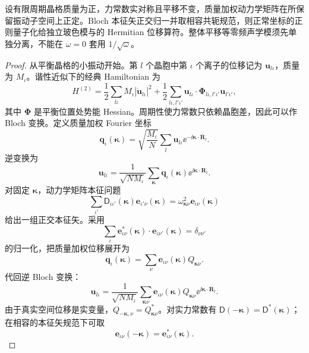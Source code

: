 \begin{theorem}[周期谐性格的正交正常模量子化]
设有限周期晶格质量为正，力常数实对称且平移不变，质量加权动力学矩阵在所保留振动子空间上正定。Bloch 本征矢正交归一并取相容共轭规范，则正常坐标的正则量子化给独立玻色模与的 Hermitian 位移算符。整体平移等零频声学模须先单独分离，不能在 $\omega=0$ 套用 $1/\sqrt\omega$。
\end{theorem}
\begin{proof}
从平衡晶格的小振动开始。第 $l$ 个晶胞中第 $\iota$ 个离子的位移记为 $\mathbf u_{l\iota}$，质量为 $M_\iota$。谐性近似下的经典 Hamiltonian 为
\[
H^{(2)}
=\frac12\sum_{l\iota}M_\iota|\dot{\mathbf u}_{l\iota}|^2
+\frac12\sum_{l\iota,l'\iota'}
\mathbf u_{l\iota}\cdot
\boldsymbol\Phi_{l\iota,l'\iota'}\mathbf u_{l'\iota'},
\]
其中 $\boldsymbol\Phi$ 是平衡位置处势能 Hessian。周期性使力常数只依赖晶胞差，因此可以作 Bloch 变换。定义质量加权 Fourier 坐标
\[
\mathbf q_\iota(\boldsymbol\kappa)
=\sqrt{\frac{M_\iota}{N}}
\sum_l\mathbf u_{l\iota}\ee^{-\ii\boldsymbol\kappa\cdot\mathbf R_l}.
\]
逆变换为
\[
\mathbf u_{l\iota}
=\frac1{\sqrt{NM_\iota}}
\sum_{\boldsymbol\kappa}
\mathbf q_\iota(\boldsymbol\kappa)
\ee^{\ii\boldsymbol\kappa\cdot\mathbf R_l}.
\]
对固定 $\boldsymbol\kappa$，动力学矩阵本征问题
\[
\sum_{\iota'}\mathsf D_{\iota\iota'}(\boldsymbol\kappa)
\mathbf e_{\iota'\nu}(\boldsymbol\kappa)
=\omega_{\boldsymbol\kappa\nu}^2
\mathbf e_{\iota\nu}(\boldsymbol\kappa)
\]
给出一组正交本征矢。采用
\[
\sum_\iota
\mathbf e_{\iota\nu}^*(\boldsymbol\kappa)\cdot
\mathbf e_{\iota\nu'}(\boldsymbol\kappa)
=\delta_{\nu\nu'}
\]
的归一化，把质量加权位移展开为
\[
\mathbf q_\iota(\boldsymbol\kappa)
=\sum_\nu\mathbf e_{\iota\nu}(\boldsymbol\kappa)
Q_{\boldsymbol\kappa\nu}.
\]
代回逆 Bloch 变换：
\[
\mathbf u_{l\iota}
=\frac1{\sqrt{NM_\iota}}
\sum_{\boldsymbol\kappa\nu}
\mathbf e_{\iota\nu}(\boldsymbol\kappa)
Q_{\boldsymbol\kappa\nu}
\ee^{\ii\boldsymbol\kappa\cdot\mathbf R_l}.
\]
由于真实空间位移是实变量，$Q_{-\boldsymbol\kappa,\nu}=Q_{\boldsymbol\kappa\nu}^*$。对实力常数有 $\mathsf D(-\boldsymbol\kappa)=\mathsf D^*(\boldsymbol\kappa)$；在相容的本征矢规范下可取
\[
\mathbf e_{\iota\nu}(-\boldsymbol\kappa)
=\mathbf e_{\iota\nu}^*(\boldsymbol\kappa).
\]


\end{proof}

